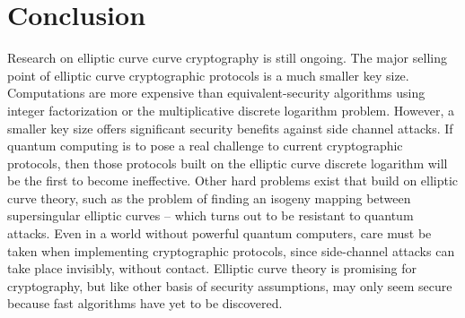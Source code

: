 \documentclass{article}
\begin{document}
\section{Conclusion}
Research on elliptic curve curve cryptography is still ongoing. The major
selling point of elliptic curve cryptographic protocols is a much smaller key
size. Computations are more expensive than equivalent-security algorithms using
integer factorization or the multiplicative discrete logarithm problem.
However, a smaller key size offers significant security benefits against side
channel attacks. If quantum computing is to pose a real challenge to current
cryptographic protocols, then those protocols built on the elliptic curve
discrete logarithm will be the first to become ineffective. Other hard problems
exist that build on elliptic curve theory, such as the problem of finding an
isogeny mapping between supersingular elliptic curves -- which turns out to be
resistant to quantum attacks. Even in a world without powerful quantum
computers, care must be taken when implementing cryptographic protocols, since
side-channel attacks can take place invisibly, without contact. Elliptic curve
theory is promising for cryptography, but like other basis of security
assumptions, may only seem secure because fast algorithms have yet to be
discovered.


\printbibliography
\end{document}

